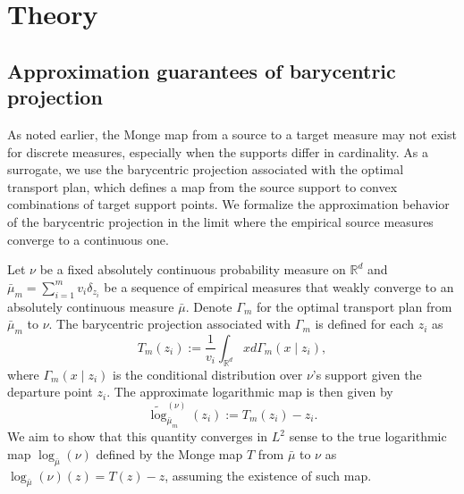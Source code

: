 \documentclass[11pt]{article}
\newcommand{\bbR}{\mathbb{R}}
\begin{document}
\section{Theory}\label{sec:chp4-theory}

\subsection{Approximation guarantees of barycentric projection}

As noted earlier, the Monge map from a source to a target measure may not exist for discrete measures, especially when the supports differ in cardinality. As a surrogate, we use the barycentric projection associated with the optimal transport plan, which defines a map from the source support to convex combinations of target support points. We formalize the approximation behavior of the barycentric projection in the limit where the empirical source measures converge to a continuous one. 

Let $\nu$ be a fixed absolutely continuous probability measure on $\bbR^d$ and $\bar{\mu}_m  = \sum_{i=1}^m v_i \delta_{z_i}$ be a sequence of empirical measures that weakly converge to an absolutely continuous measure $\bar{\mu}$. Denote $\Gamma_m$ for the optimal transport plan from $\bar{\mu}_m$ to $\nu$. The barycentric projection associated with $\Gamma_m$ is defined for each $z_i$ as 
\begin{equation*}
    T_m(z_i):= \frac{1}{v_i} \int_{\bbR^d} x d\Gamma_m(x\mid z_i),
\end{equation*}
where $\Gamma_m(x\mid z_i)$ is the conditional distribution over $\nu$'s support given the departure point $z_i$. The approximate logarithmic map is then given by 
\begin{equation*}
    \widetilde{\log}_{\bar{\mu}_m}^{(\nu)}(z_i):= T_m(z_i)-z_i.
\end{equation*}
We aim to show that this quantity converges in $L^2$ sense to the true logarithmic map $\log_{\bar{\mu}}(\nu)$ defined by the Monge map $T$ from $\bar{\mu}$ to $\nu$ as $\log_{\bar{\mu}}(\nu)(z) = T(z)-z$, assuming the existence of such map.
\end{document}
